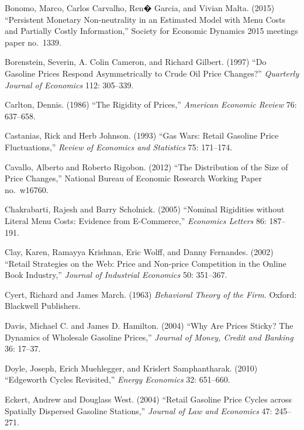 \documentclass[11pt]{article}
\begin{document}
\begin{description}
\item Bonomo, Marco, Carlos Carvalho, Ren� Garcia, and Vivian
  Malta. (2015) ``Persistent Monetary Non-neutrality in an Estimated
  Model with Menu Costs and Partially Costly Information,'' Society
  for Economic Dynamics 2015 meetings paper no.~1339.

\item Borenstein, Severin, A. Colin Cameron, and Richard
  Gilbert. (1997) ``Do Gasoline Prices Respond Asymmetrically to Crude
  Oil Price Changes?'' {\it Quarterly Journal of Economics} 112:
  305--339.

\item Carlton, Dennis. (1986) ``The Rigidity of Prices,'' {\it
  American Economic Review} 76: 637--658.

\item Castanias, Rick and Herb Johnson. (1993) ``Gas Wars: Retail
  Gasoline Price Fluctuations,'' {\it Review of Economics and
    Statistics} 75: 171--174.

\item Cavallo, Alberto and Roberto Rigobon. (2012) ``The Distribution
  of the Size of Price Changes,'' National Bureau of Economic Research
  Working Paper no.~w16760.

\item Chakrabarti, Rajesh and Barry Scholnick. (2005) ``Nominal
  Rigidities without Literal Menu Costs: Evidence from E-Commerce,''
  {\it Economics Letters} 86: 187--191.

\item Clay, Karen, Ramayya Krishnan, Eric Wolff, and Danny
  Fernandes. (2002) ``Retail Strategies on the Web: Price and
  Non-price Competition in the Online Book Industry,'' {\it Journal of
    Industrial Economics} 50: 351--367.

\item Cyert, Richard and James March. (1963) {\it Behavioral Theory of
  the Firm}.  Oxford: Blackwell Publishers.

\item Davis, Michael C. and James D. Hamilton. (2004) ``Why Are Prices
  Sticky? The Dynamics of Wholesale Gasoline Prices,'' {\it Journal of
    Money, Credit and Banking} 36: 17--37. 

\item Doyle, Joseph, Erich Muehlegger, and Krislert
  Samphantharak. (2010) ``Edgeworth Cycles Revisited,'' {\em Energy
    Economics} 32: 651--660.

\item Eckert, Andrew and Douglass West. (2004) ``Retail Gasoline Price
  Cycles across Spatially Dispersed Gasoline Stations,'' {\it Journal
    of Law and Economics} 47: 245--271.


\end{description}
\end{document}
